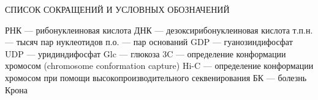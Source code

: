 \printnomenclature[3.5cm] %
СПИСОК СОКРАЩЕНИЙ И УСЛОВНЫХ ОБОЗНАЧЕНИЙ

РНК --- рибонуклеиновая кислота
ДНК --- дезоксирибонуклеиновая кислота
т.п.н. ---  тысяч пар нуклеотидов
п.о. --- пар оснований
GDP --- гуанозиндифосфат
UDP --- уридиндифосфат
Glc --- глюкоза
3C --- определение конформации хромосом (chromosome conformation capture)
Hi-C --- определение конформации хромосом при помощи высокопроизводительного секвенирования
БК --- болезнь Крона

